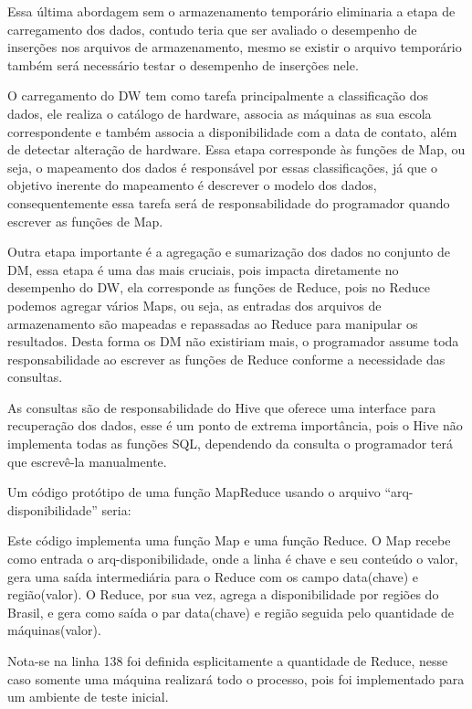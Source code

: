 \documentclass[a4paper,12pt]{article}
\begin{document}
Essa última abordagem sem o armazenamento temporário eliminaria a etapa de
carregamento dos dados, contudo teria que ser avaliado o desempenho de inserções
nos arquivos de armazenamento, mesmo se existir o arquivo temporário também será
necessário testar o desempenho de inserções nele.

O carregamento do DW tem como tarefa principalmente a classificação dos dados,
ele realiza o catálogo de hardware, associa as máquinas as sua escola
correspondente e também associa a disponibilidade com a data de contato, além de
detectar alteração de hardware. Essa etapa corresponde às funções de Map, ou
seja, o mapeamento dos dados é responsável por essas classificações, já que o
objetivo inerente do mapeamento é descrever o modelo dos dados, consequentemente
essa tarefa será de responsabilidade do programador quando escrever as funções
de Map.

Outra etapa importante é a agregação e sumarização dos dados no conjunto de DM,
essa etapa é uma das mais cruciais, pois impacta diretamente no desempenho do
DW, ela corresponde as funções de Reduce, pois no Reduce podemos
agregar vários Maps, ou seja, as entradas dos arquivos de armazenamento são
mapeadas e repassadas ao Reduce para manipular os resultados. Desta forma os DM
não existiriam mais, o programador assume toda responsabilidade ao escrever as
funções de Reduce conforme a necessidade das consultas.

As consultas são de responsabilidade do Hive que oferece uma interface para
recuperação dos dados, esse é um ponto de extrema importância, pois o Hive não
implementa todas as funções SQL, dependendo da consulta o programador terá que
escrevê-la manualmente.

Um código protótipo de uma função MapReduce usando o arquivo
“arq-disponibilidade” seria:



Este código implementa uma função Map e uma função Reduce. O Map recebe como entrada
o arq-disponibilidade, onde a linha é chave e seu conteúdo o valor, gera uma saída
intermediária para o Reduce com os campo data(chave) e região(valor). O Reduce,
por sua vez, agrega a disponibilidade por regiões do Brasil, e gera como saída
o par data(chave) e região seguida pelo quantidade de máquinas(valor).

Nota-se na linha 138 foi definida esplicitamente a quantidade de Reduce, nesse caso
somente uma máquina realizará todo o processo, pois foi implementado para um ambiente
de teste inicial.
\end{document}
